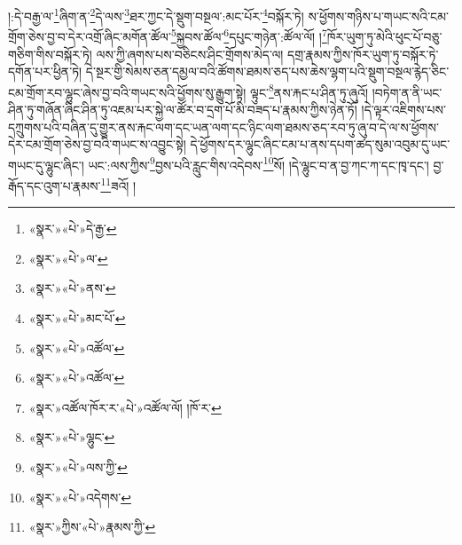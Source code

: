།:དེ་བརྒྱ་ལ་\footnote{«སྣར་»«པེ་»དེ་རྒྱ་}ཞིག་ན་\footnote{«སྣར་»«པེ་»ལ་}དེ་ལས་\footnote{«སྣར་»«པེ་»ནས་}ཐར་ཀྱང་དེ་སྡུག་བསྔལ་:མང་པོར་\footnote{«སྣར་»«པེ་»མང་པོ་}བསྐོར་ཏེ། ས་ཕྱོགས་གཉིས་པ་གཡང་སའི་ངམ་གྲོག་ཅེས་བྱ་བ་དེར་འགྲོ་ཞིང་མགོན་ཚོལ་\footnote{«སྣར་»«པེ་»འཚོལ་}སྐྱབས་ཚོལ་\footnote{«སྣར་»«པེ་»འཚོལ་}དཔུང་གཉེན་:ཚོལ་ལོ། །\footnote{«སྣར་»འཚོལ་ཁོར་ར་«པེ་»འཚོལ་ལོ། །ཁོ་ར་}ཁོར་ཡུག་ཏུ་མེའི་ཕུང་པོ་བཅུ་གཅིག་གིས་བསྐོར་ཏེ། ལས་ཀྱི་ཞགས་པས་བཅིངས་ཤིང་གྲོགས་མེད་ལ། དགྲ་རྣམས་ཀྱིས་ཁོར་ཡུག་ཏུ་བསྐོར་ཏེ་དགོན་པར་ཕྱིན་ཏེ། དེ་སྔར་གྱི་སེམས་ཅན་དམྱལ་བའི་ཚོགས་ཐམས་ཅད་པས་ཆེས་ལྷག་པའི་སྡུག་བསྔལ་རྙེད་ཅིང་ངམ་གྲོག་རབ་ལྷུང་ཞེས་བྱ་བའི་གཡང་སའི་ཕྱོགས་སུ་རྒྱུག་སྟེ། ལྟུང་\footnote{«སྣར་»«པེ་»ལྷུང་}ནས་རྐང་པ་ཤིན་ཏུ་ཞུའོ། །བཏེག་ན་ནི་ཡང་ཤིན་ཏུ་གཞོན་ཞིང་ཤིན་ཏུ་འཇམ་པར་སྐྱེ་ལ་ཚོར་བ་དྲག་པོ་མི་བཟད་པ་རྣམས་ཀྱིས་ཉེན་ཏོ། །དེ་ལྟར་འཇིགས་པས་དཀྲུགས་པའི་བཞིན་དུ་གྱུར་ནས་རྐང་ལག་དང་ཡན་ལག་དང་ཉིང་ལག་ཐམས་ཅད་རབ་ཏུ་ཞུ་བ་དེ་ལ་ས་ཕྱོགས་དེར་ངམ་གྲོག་ཅེས་བྱ་བའི་གཡང་ས་འབྱུང་སྟེ། དེ་ཕྱོགས་དར་ལྷུང་ཞིང་ངམ་པ་ནས་དཔག་ཚད་སུམ་འབུམ་དུ་ཡང་གཡང་དུ་ལྷུང་ཞིང་། ཡང་:ལས་ཀྱིས་\footnote{«སྣར་»«པེ་»ལས་ཀྱི་}བྱས་པའི་རླུང་གིས་འདེབས་\footnote{«སྣར་»«པེ་»འདེགས་}སོ། །དེ་ལྷུང་བ་ན་བྱ་ཀང་ཀ་དང་ཁྭ་དང་། བྱ་རྒོད་དང་འུག་པ་རྣམས་\footnote{«སྣར་»ཀྱིས་«པེ་»རྣམས་ཀྱི་}ཟའོ། །
